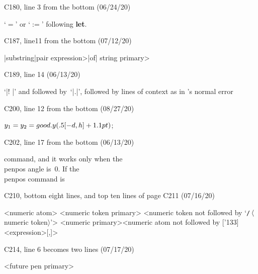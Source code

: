 \bugonpage C180, line 3 from the bottom (06/24/20)

\ninepoint\indent
`$=$' or `$:=$' following {\bf let}.

\bugonpage C187, line11 from the bottom (07/12/20)

\ninepoint\indent\qquad
\alt|substring|\thinspace\<pair expression>\thinspace|of|\thinspace
 \<string primary>

\bugonpage C189, line 14 (06/13/20)

\ninepoint\noindent
`|! |' and followed
by~`|.|', followed by lines of context as in \MF's normal error\cutpar

\bugonpage C200, line 12 from the bottom (08/27/20)

\ninepoint\indent
$y_1=y_2=\\{good.y}(.5[-d,h]+1.1\\{pt})$;

\bugonpage C202, line 17 from the bottom (06/13/20)

\ninepoint\noindent
command,
and it works only when the \\{penpos} angle is~0. If the \\{penpos} command
is\cutpar

\bugonpage C210, bottom eight lines, and top ten lines of page C211 (07/16/20)

\ninepoint\noindent
\beginsyntax
<numeric atom>
 \alt[normaldeviate]
<numeric token primary>
 \alt<numeric token not followed by %
  `{\tt/}$\thinspace\langle$numeric token$\rangle$'\thinspace>
<numeric primary>\is<numeric atom not followed by {[\char'133]<expression>[,]}>
\endsyntax

\bugonpage C214, line 6 becomes two lines (07/17/20)

\ninepoint\noindent
\beginsyntax
<future pen primary>
 \alt[pencircle]
\endsyntax

